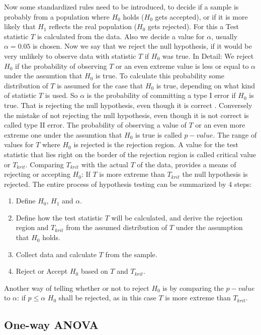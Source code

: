 \documentclass[12 pt]{scrartcl}
\begin{document}
Now some standardized rules need to be introduced, to decide if a sample is probably from a population where $H_0$ holds ($H_0$ gets accepted), or if it is more likely that $H_1$ reflects the real population ($H_0$ gets rejected). For this a Test statistic $T$ is calculated from the data. Also we decide a value for $\alpha$, usually $\alpha = 0.05$ is chosen.
Now we say that we reject the null hypothesis, if it would be very unlikely to observe data with statistic $T$ if $H_0$ was true. In Detail: We reject $H_0$ if the probability of observing $T$ or an even extreme value is less or equal to $\alpha$ under the assumtion that $H_0$ is true. To calculate this probability some distribution of $T$ is assumed for the case that $H_0$ is true, depending on what kind of statistic $T$ is used. So $\alpha$ is the probability of committing a type I error if $H_0$ is true. That is rejecting the null hypothesis, even though it is correct \citep[p.~222]{eid2017statistik}. Conversely the mistake of not rejecting the null hypothesis, even though it is not correct is called type II error.
The probability of observing a value of $T$ or an even more extreme one under the assumtion that $H_0$ is true is called $p-value$.
The range of values for $T$ where $H_0$ is rejected is the rejection region. A value for the test statistic that lies right on the border of the rejection region is called critical value or $T_{krit}$. Comparing $T_{krit}$ with the actual $T$ of the data, provides a means of rejecting or accepting $H_0$: If $T$ is more extreme than $T_{krit}$ the null hypothesis is rejected.
The entire process of hypothesis testing can be summarized by 4 steps:
\begin{enumerate}
  \item Define $H_0$, $H_1$ and $\alpha$.
  \item Define how the test statistic $T$ will be calculated, and derive the rejection region and $T_{krit}$ from the assumed distribution of $T$ under the assumption that $H_0$ holds.
  \item Collect data and calculate $T$ from the sample.
  \item Reject or Accept $H_0$ based on $T$ and $T_{krit}$.
\end{enumerate}
Another way of telling whether or not to reject $H_0$ is by comparing the $p-value$ to $\alpha$: if $p \leq \alpha$ $H_0$ shall be rejected, as in this case $T$ is more extreme than $T_{krit}$.


\subsection{One-way ANOVA}
\end{document}
